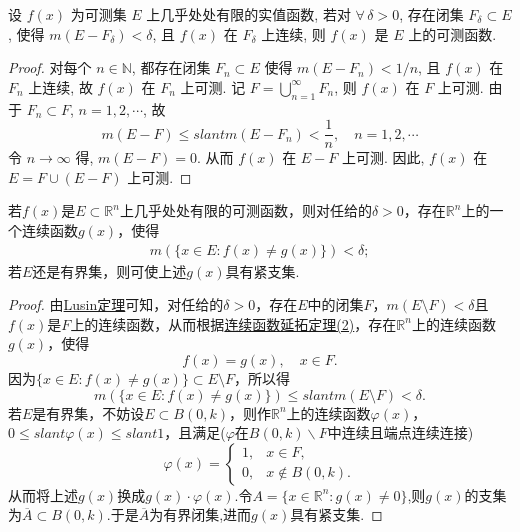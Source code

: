 \documentclass[../../main.tex]{subfiles}
\begin{document}
\begin{theorem}\label{theorem:Lusin定理的逆定理}
设 \( f(x) \) 为可测集 \( E \) 上几乎处处有限的实值函数, 若对 \( \forall\,\delta > 0 \), 存在闭集 \( F_{\delta} \subset E \), 使得 \( m(E - F_{\delta}) < \delta \), 且 \( f(x) \) 在 \( F_{\delta} \) 上连续, 则 \( f(x) \) 是 \( E \) 上的可测函数.
\end{theorem}
\begin{proof}
对每个 \( n \in \mathbb{N} \), 都存在闭集 \( F_{n} \subset E \) 使得 \( m(E - F_{n}) < 1/n \), 且 \( f(x) \) 在 \( F_{n} \) 上连续, 故 \( f(x) \) 在 \( F_{n} \) 上可测.
记 \( F = \bigcup_{n = 1}^{\infty} F_{n} \), 则 \( f(x) \) 在 \( F \) 上可测. 由于 \( F_{n} \subset F \), \( n = 1, 2, \cdots \), 故
\[
m(E - F) \leqslant slant m(E - F_{n}) < \frac{1}{n}, \quad n = 1, 2, \cdots
\]
令 \( n \to \infty \) 得, \( m(E - F) = 0 \). 从而 \( f(x) \) 在 \( E - F \) 上可测. 因此, \( f(x) \) 在 \( E = F \cup (E - F) \) 上可测.
\end{proof}

\begin{corollary}\label{corollary:推论3.19}
若\(f(x)\)是\(E \subset \mathbb{R}^{n}\)上几乎处处有限的可测函数，则对任给的\(\delta > 0\)，存在\(\mathbb{R}^{n}\)上的一个连续函数\(g(x)\)，使得
\begin{align*}
m(\{x \in E: f(x) \neq g(x)\}) < \delta; 
\end{align*}
若\(E\)还是有界集，则可使上述\(g(x)\)具有紧支集.
\end{corollary}
\begin{proof}
由\hyperref[theorem:Lusin(卢津)定理]{Lusin定理}可知，对任给的\(\delta > 0\)，存在\(E\)中的闭集\(F\)，\(m(E \setminus F) < \delta\)且\(f(x)\)是\(F\)上的连续函数，从而根据\hyperref[theorem:连续函数延拓定理]{连续函数延拓定理(2)}，存在\(\mathbb{R}^{n}\)上的连续函数\(g(x)\)，使得
\[f(x) = g(x), \quad x \in F.\]
因为\(\{x \in E: f(x) \neq g(x)\} \subset E \setminus F\)，所以得
\[m(\{x \in E: f(x) \neq g(x)\}) \leqslant slant m(E \setminus F) < \delta.\]
若\(E\)是有界集，不妨设\(E \subset B(0, k)\)，则作\(\mathbb{R}^{n}\)上的连续函数\(\varphi(x)\)，\(0 \leqslant slant \varphi(x) \leqslant slant 1\)，且满足($\varphi$在$B(0,k)\backslash F$中连续且端点连续连接)
\[\varphi(x) = 
\begin{cases}
1, & x \in F, \\
0, & x \notin B(0, k).
\end{cases}\]
从而将上述\(g(x)\)换成\(g(x) \cdot \varphi(x)\).令$A=\{x\in \mathbb{R}^n:g(x)\ne 0\}$,则$g(x)$的支集为$\overline{A}\subset B(0,k)$.于是$\overline{A}$为有界闭集,进而$g(x)$具有紧支集.
\end{proof}
\end{document}

